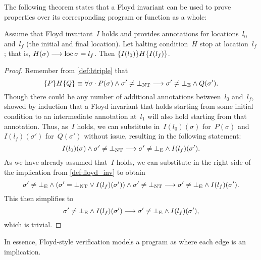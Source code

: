 The following theorem states that a Floyd invariant
can be used to prove properties over its corresponding program or function
as a whole:
\begin{theorem}\label{thm:floyd_hoare}
  Assume that Floyd invariant~$I$ holds and provides annotations for locations~$l_0$ and~$l_f$ (the initial and final location).
  Let halting condition~$H$ stop at location~$l_f$;%
  that is, $H(\sigma)\longrightarrow\operatorname{loc}\sigma=l_f$.
  Then $\{I(l_0)\}H\{I(l_f)\}$.
\end{theorem}
\begin{proof}
  Remember from \cref{def:htriple} that
  \begin{equation*}
    \{P\}H\{Q\}\equiv\forall\sigma\cdot
    P(\sigma)\land\sigma'\neq\bot_\mathrm{NT}\longrightarrow
    \sigma'\neq\bot_\mathrm{E}\land Q(\sigma').
  \end{equation*}
  Though there could be any number of additional annotations between~$l_0$
  and~$l_f$, \textcite{floyd1967assigning} showed by induction
  that a Floyd invariant that holds starting from some initial condition
  to an intermediate annotation at~$l_1$ will also hold starting from that annotation.
  Thus, as~$I$ holds, we can substitute in~$I(l_0)(\sigma)$ for~$P(\sigma)$
  and~$I(l_f)(\sigma')$ for~$Q(\sigma')$ without issue,
  resulting in the following statement:
  \begin{equation*}
      I(l_0)(\sigma)\land\sigma'\neq\bot_\mathrm{NT}\longrightarrow
      \sigma'\neq\bot_\mathrm{E}\land I(l_f)(\sigma').
  \end{equation*}
  As we have already assumed that~$I$ holds,
  we can substitute in the right side of the implication from \cref{def:floyd_inv}
  to obtain
  \begin{equation*}
    \sigma'\neq\bot_\mathrm{E}\land(\sigma'=\bot_\mathrm{NT}\lor I(l_f)(\sigma'))\land
    \sigma'\neq\bot_\mathrm{NT}\longrightarrow
    \sigma'\neq\bot_\mathrm{E}\land I(l_f)(\sigma').
  \end{equation*}
  This then simplifies to
  \begin{equation*}
    \sigma'\neq\bot_\mathrm{E}\land I(l_f)(\sigma')\longrightarrow
    \sigma'\neq\bot_\mathrm{E}\land I(l_f)(\sigma'),
  \end{equation*}
  which is trivial.
\end{proof}
In essence, Floyd-style verification%
models a program as  where each edge is an implication.

